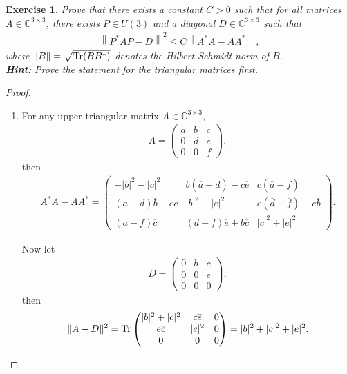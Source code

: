 \documentclass[11pt]{article}
\newtheorem{exercise}{Exercise}[section]
\theoremstyle{definition}
\numberwithin{equation}{subsection}
\begin{document}
\medskip

\begin{exercise}{\rm *}
Prove that there exists a constant $C > 0$ such that for all matrices $A \in \mathbb{C}^{3 \times 3}$, there exists $P \in U(3)$ and a diagonal $D \in \mathbb{C}^{3 \times 3}$ such that
\begin{align*}
    \left\| P^*AP - D \right\|^2 \leq C \left\| A^* A - A A^* \right\|,
\end{align*}
where $\|B\| = \sqrt{\Tr (B B^*)}$ denotes the Hilbert-Schmidt norm of $B$.\\
{\bf Hint:} Prove the statement for the triangular matrices first.
\end{exercise}
\begin{proof}
~\begin{enumerate}[label=(\alph*)]
    \item For any upper triangular matrix $A \in \mathbb{C}^{3 \times 3}$,
    \begin{align*}
        A = \begin{pmatrix}
            a & b & c \\
            0 & d & e \\
            0 & 0 & f
        \end{pmatrix},
    \end{align*}
    then
    \begin{align*}
        A^*A - AA^* = \begin{pmatrix}
            -|b|^2 - |c|^2 & b(\overline{a} - \overline{d}) - c \overline{e} & c(\overline{a} - \overline{f}) \\
            (a - d)\overline{b} - e \overline{c} & |b|^2 - |e|^2 & e(\overline{d} - \overline{f}) + e \overline{b}\\
            (a - f)\overline{c} & (d - f) \overline{e} + b \overline{c} & |c|^2 + |e|^2
        \end{pmatrix}.
    \end{align*}
    
    Now let
    \begin{align*}
        D = \begin{pmatrix}
            0 & b & c \\
            0 & 0 & e \\
            0 & 0 & 0
        \end{pmatrix},
    \end{align*}
    then
    \begin{align*}
        \|A - D\|^2 = \Tr \begin{pmatrix}
            |b|^2 + |c|^2 & c \overline{e} & 0 \\
            e \overline{c} & |e|^2 & 0 \\
            0 & 0 & 0
         \end{pmatrix} = |b|^2 + |c|^2 + |e|^2.
    \end{align*}
    

\end{enumerate}
\end{proof}
\end{document}
